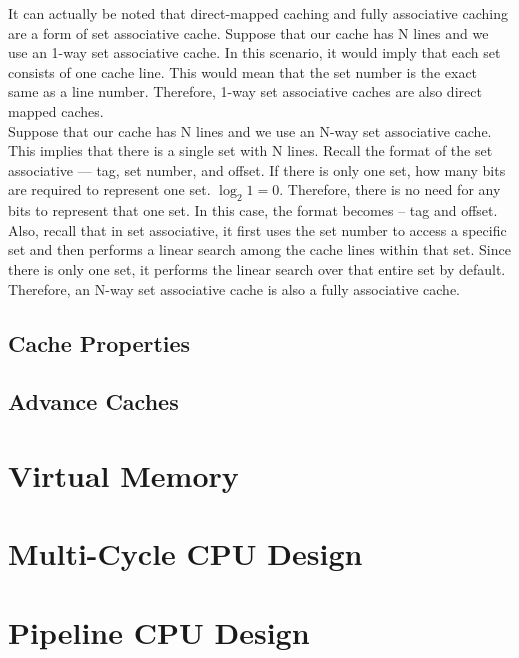 \documentclass[11pt]{article}
\begin{document}
It can actually be noted that direct-mapped caching and fully associative caching are a form of set associative cache. Suppose that our cache has N lines and we use an 1-way set associative cache. In this scenario, it would imply that each set consists of one cache line. This would mean that the set number is the exact same as a line number. Therefore, 1-way set associative caches are also direct mapped caches.\\

\noindent Suppose that our cache has N lines and we use an N-way set associative cache. This implies that there is a single set with N lines. Recall the format of the set associative --- tag, set number, and offset. If there is only one set, how many bits are required to represent one set. \( \log_2 1 = 0 \). Therefore, there is no need for any bits to represent that one set. In this case, the format becomes -- tag and offset. Also, recall that in set associative, it first uses the set number to access a specific set and then performs a linear search among the cache lines within that set. Since there is only one set, it performs the linear search over that entire set by default. Therefore, an N-way set associative cache is also a fully associative cache.

\subsection{Cache Properties}

\subsection{Advance Caches}

\section{Virtual Memory}

\section{Multi-Cycle CPU Design}

\section{Pipeline CPU Design}
\end{document}
